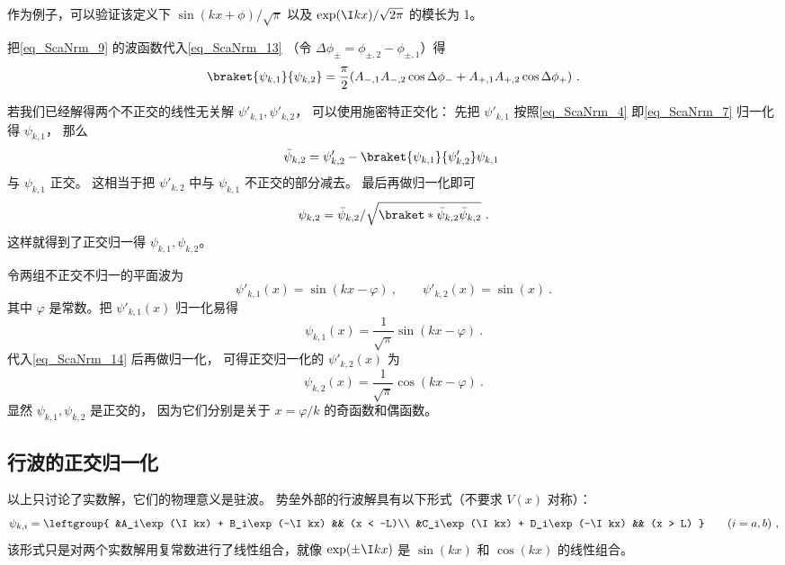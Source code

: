 作为例子，可以验证该定义下 $\sin(kx+\phi)/\sqrt{\pi}$ 以及 $\exp(\I kx)/\sqrt{2\pi}$ 的模长为 1。 

把\autoref{eq_ScaNrm_9} 的波函数代入\autoref{eq_ScaNrm_13} （令 $\Delta\phi_\pm = \phi_{\pm, 2} - \phi_{\pm, 1}$）得
\begin{equation}
\braket{\psi_{k,1}}{\psi_{k,2}} = \frac{\pi}{2}(A_{-,1}A_{-,2}\cos\Delta\phi_- + A_{+,1}A_{+,2}\cos\Delta\phi_+)~.
\end{equation}


若我们已经解得两个不正交的线性无关解 $\psi'_{k,1}, \psi'_{k,2}$， 可以使用施密特正交化： 先把 $\psi'_{k,1}$ 按照\autoref{eq_ScaNrm_4} 即\autoref{eq_ScaNrm_7} 归一化得 $\psi_{k,1}$， 那么
\begin{equation}\label{eq_ScaNrm_14}
\bar\psi_{k,2} = \psi_{k,2}' - \braket{\psi_{k,1}}{\psi'_{k,2}} \psi_{k,1}~
\end{equation}
与 $\psi_{k,1}$ 正交。 这相当于把 $\psi'_{k,2}$ 中与 $\psi_{k,1}$ 不正交的部分减去。 最后再做归一化即可
\begin{equation}\label{eq_ScaNrm_15}
\psi_{k,2} = \bar\psi_{k,2}/\sqrt{\braket*{\bar\psi_{k,2}}{\bar\psi_{k,2}}}~.
\end{equation}
这样就得到了正交归一得 $\psi_{k,1}, \psi_{k,2}$。

\begin{example}{}
令两组不正交不归一的平面波为
\begin{equation}
\psi'_{k,1}(x) = \sin(kx - \varphi)~, \qquad
\psi'_{k,2}(x) = \sin(x)~.
\end{equation}
其中 $\varphi$ 是常数。把 $\psi'_{k,1}(x)$ 归一化易得
\begin{equation}
\psi_{k,1}(x) = \frac{1}{\sqrt{\pi}}\sin(kx - \varphi)~.
\end{equation}
代入\autoref{eq_ScaNrm_14} 后再做归一化， 可得正交归一化的 $\psi'_{k,2}(x)$ 为
\begin{equation}
\psi_{k,2}(x) = \frac{1}{\sqrt{\pi}}\cos(kx - \varphi)~.
\end{equation}
显然 $\psi_{k,1}, \psi_{k,2}$ 是正交的， 因为它们分别是关于 $x = \varphi/k$ 的奇函数和偶函数。
\end{example}

\subsection{行波的正交归一化}
以上只讨论了实数解，它们的物理意义是驻波。 势垒外部的行波解具有以下形式（不要求 $V(x)$ 对称）：
\begin{equation}
\psi_{k,i} = \leftgroup{
    &A_i\exp(\I kx) + B_i\exp(-\I kx) && (x < -L)\\
    &C_i\exp(\I kx) + D_i\exp(-\I kx) && (x > L)
} \qquad (i = a,b)~,
\end{equation}
该形式只是对两个实数解用复常数进行了线性组合，就像 $\exp(\pm\I kx)$ 是 $\sin(kx)$ 和 $\cos(kx)$ 的线性组合。

